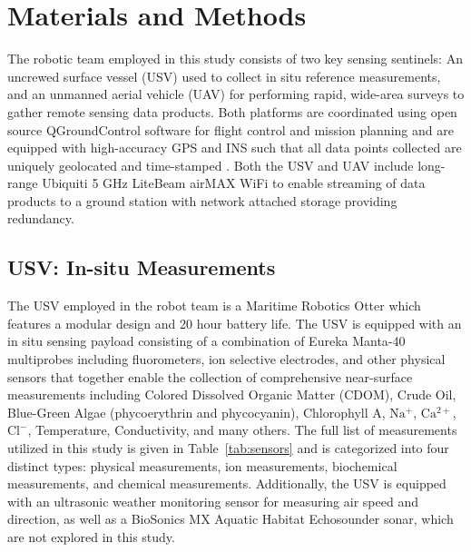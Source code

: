 \documentclass[remotesensing,article,submit,pdftex,moreauthors]{Definitions/mdpi}
\begin{document}

\section{Materials and Methods}

 The robotic team employed in this study consists of two key sensing sentinels: An uncrewed surface vessel (USV) used to collect in situ reference measurements, and an unmanned aerial vehicle (UAV) for performing rapid, wide-area surveys to gather remote sensing data products. Both platforms are coordinated using open source QGroundControl software for flight control and mission planning and are equipped with high-accuracy GPS and INS such that all data points collected are uniquely geolocated and time-stamped \cite{qgroundcontrol}. Both the USV and UAV include long-range Ubiquiti 5 GHz LiteBeam airMAX WiFi to enable streaming of data products to a ground station with network attached storage providing redundancy.

\subsection{USV: In-situ Measurements}

The USV employed in the robot team is a Maritime Robotics Otter which features a modular design and 20 hour battery life. The USV is equipped with an in situ sensing payload consisting of a combination of Eureka Manta-40 multiprobes including fluorometers, ion selective electrodes, and other physical sensors that together enable the collection of comprehensive near-surface measurements including Colored Dissolved Organic Matter (CDOM), Crude Oil, Blue-Green Algae (phycoerythrin and phycocyanin), Chlorophyll A, $\mathrm{Na^+}$, $\mathrm{Ca^{2+}}$, $\mathrm{Cl^-}$, Temperature, Conductivity, and many others. The full list of measurements utilized in this study is given in Table~\ref{tab:sensors} and is categorized into four distinct types: physical measurements, ion measurements, biochemical measurements, and chemical measurements. Additionally, the USV is equipped with an ultrasonic weather monitoring sensor for measuring air speed and direction, as well as a BioSonics MX Aquatic Habitat Echosounder sonar, which are not explored in this study.

\end{document}
